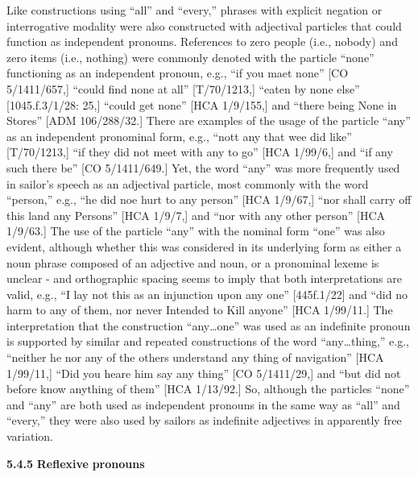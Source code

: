   Like constructions using “all” and “every,” phrases with explicit negation or interrogative modality were also constructed with adjectival particles that could function as independent pronouns. References to zero people (i.e., nobody) and zero items (i.e., nothing) were commonly denoted with the particle “none” functioning as an independent pronoun, e.g., “if you maet none” [CO 5/1411/657,] “could find none at all” [T/70/1213,] “eaten by none else” [1045.f.3/1/28: 25,] “could get none” [HCA 1/9/155,] and “there being None in Stores” [ADM 106/288/32.] There are examples of the usage of the particle “any” as an independent pronominal form, e.g., “nott any that wee did like” [T/70/1213,] “if they did not meet with any to go” [HCA 1/99/6,] and “if any such there be” [CO 5/1411/649.] Yet, the word “any” was more frequently used in sailor’s speech as an adjectival particle, most commonly with the word “person,” e.g., “he did noe hurt to any person” [HCA 1/9/67,] “nor shall carry off this land any Persons” [HCA 1/9/7,] and “nor with any other person” [HCA 1/9/63.] The use of the particle “any” with the nominal form “one” was also evident, although whether this was considered in its underlying form as either a noun phrase composed of an adjective and noun, or a pronominal lexeme is unclear - and orthographic spacing seems to imply that both interpretations are valid, e.g., “I lay not this as an injunction upon any one” [445f.1/22] and “did no harm to any of them, nor never Intended to Kill anyone” [HCA 1/99/11.] The interpretation that the construction “any…one” was used as an indefinite pronoun is supported by similar and repeated constructions of the word “any…thing,” e.g., “neither he nor any of the others understand any thing of navigation” [HCA 1/99/11,] “Did you heare him say any thing” [CO 5/1411/29,] and “but did not before know anything of them” [HCA 1/13/92.] So, although the particles “none” and “any” are both used as independent pronouns in the same way as “all” and “every,” they were also used by sailors as indefinite adjectives in apparently free variation.

  \textbf{5.4.5} \textbf{Reflexive} \textbf{pronouns}

